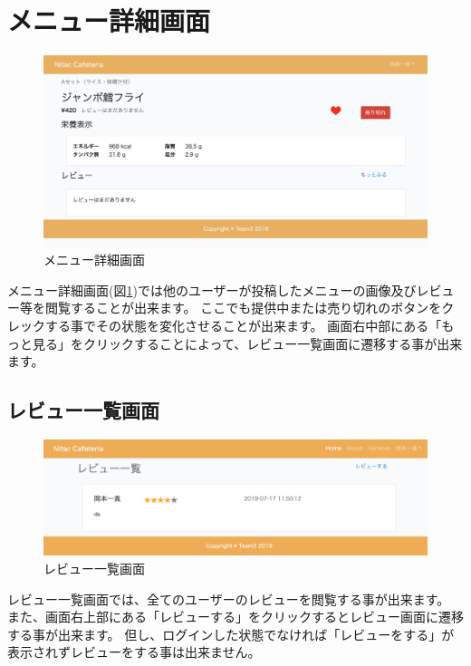 \documentclass[a4paper]{ltjsarticle}
\begin{document}
\section{メニュー詳細画面}
    \begin{figure}[htbp]
    \centering
        \caption{メニュー詳細画面}
        \label{menu_detail}
        \includegraphics[width=1\textwidth]{image/menu_detail.png}
    \end{figure}
    メニュー詳細画面(図\ref{menu_detail})では他のユーザーが投稿したメニューの画像及びレビュー等を閲覧することが出来ます。
    ここでも提供中または売り切れのボタンをクレックする事でその状態を変化させることが出来ます。
    画面右中部にある「もっと見る」をクリックすることによって、レビュー一覧画面に遷移する事が出来ます。

\subsection{レビュー一覧画面}
    \begin{figure}[htbp]
    \centering
        \caption{レビュー一覧画面}
        \includegraphics[scale = 0.3]{image/review.png}
    \end{figure}
    レビュー一覧画面では、全てのユーザーのレビューを閲覧する事が出来ます。
    また、画面右上部にある「レビューする」をクリックするとレビュー画面に遷移する事が出来ます。
    但し、ログインした状態でなければ「レビューをする」が表示されずレビューをする事は出来ません。
    \newpage
\end{document}
